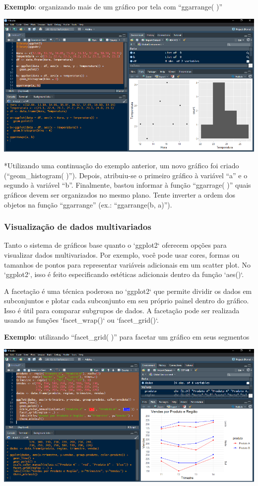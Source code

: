 \documentclass[
]{book}
\begin{document}
\textbf{Exemplo}: organizando mais de um gráfico por tela com ``ggarrange( )''

\includegraphics{images/clipboard-469555772.png}

*Utilizando uma continuação do exemplo anterior, um novo gráfico foi criado (``geom\_histogram( )''). Depois, atribuiu-se o primeiro gráfico à variável ``a'' e o segundo à variável ``b''. Finalmente, bastou informar à função ``ggarrage( )'' quais gráficos devem ser organizados no mesmo plano. Tente inverter a ordem dos objetos na função ``ggarrange'' (ex.: ``ggarrange(b, a)'').

\subsubsection{Visualização de dados multivariados}\label{visualizauxe7uxe3o-de-dados-multivariados}

Tanto o sistema de gráficos base quanto o `ggplot2` oferecem opções para visualizar dados multivariados. Por exemplo, você pode usar cores, formas ou tamanhos de pontos para representar variáveis adicionais em um scatter plot. No `ggplot2`, isso é feito especificando estéticas adicionais dentro da função `aes()`.

A facetação é uma técnica poderosa no `ggplot2` que permite dividir os dados em subconjuntos e plotar cada subconjunto em seu próprio painel dentro do gráfico. Isso é útil para comparar subgrupos de dados. A facetação pode ser realizada usando as funções `facet\_wrap()` ou `facet\_grid()`.

\textbf{Exemplo}: utilizando ``facet\_grid( )'' para facetar um gráfico em seus segmentos

\includegraphics{images/clipboard-928999128.png}
\end{document}
